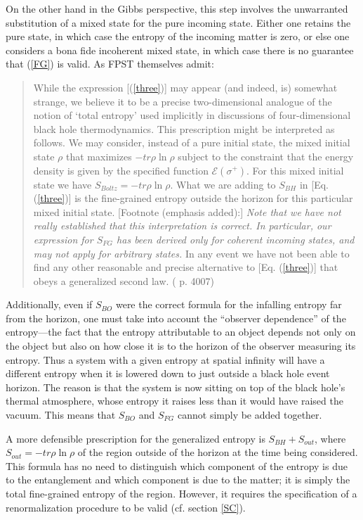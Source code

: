 \documentclass{article}
\begin{document}
On the other hand in the Gibbs perspective, this step involves the unwarranted substitution of a mixed state for the pure incoming state.  Either one retains the pure state, in which case the entropy of the incoming matter is zero, or else one considers a bona fide incoherent mixed state, in which case there is no guarantee that (\ref{FG}) is valid.  As FPST themselves admit:
\begin{quote}\small
While the expression [(\ref{three})] may appear (and indeed, is) somewhat strange, we believe it to be a precise two-dimensional analogue of the notion of `total entropy' used implicitly in discussions of four-dimensional black hole thermodynamics.  This prescription might be interpreted as follows.  We may consider, instead of a pure initial state, the mixed initial state $\rho$ that maximizes $-tr \rho\ln \rho$ subject to the constraint that the energy density is given by the specified function $\mathcal{E}(\sigma^{+})$.  For this mixed initial state we have $S_{Boltz} = -tr \rho\ln \rho$.  What we are adding to $S_{BH}$ in [Eq. (\ref{three})] is the fine-grained entropy outside the horizon for this particular mixed initial state.  [Footnote (emphasis added):] \emph{Note that we have not really established that this interpretation is correct.  In particular, our expression for $S_{FG}$ has been derived only for coherent incoming states, and may not apply for arbitrary states.}  In any event we have not been able to find any other reasonable and precise alternative to [Eq. (\ref{three})] that obeys a generalized second law.  (\cite{fiola94} p. 4007)
\end{quote}
Additionally, even if $S_{BO}$ were the correct formula for the infalling entropy far from the horizon, one must take into account the ``observer dependence'' \cite{MMR04} of the entropy---the fact that the entropy attributable to an object depends not only on the object but also on how close it is to the horizon of the observer measuring its entropy.  Thus a system with a given entropy at spatial infinity will have a different entropy when it is lowered down to just outside a black hole event horizon.  The reason is that the system is now sitting on top of the black hole's thermal atmosphere, whose entropy it raises less than it would have raised the vacuum.  This means that $S_{BO}$ and $S_{FG}$ cannot simply be added together.

A more defensible prescription for the generalized entropy is $S_{BH} + S_{out}$, where $S_{out} = -tr \rho\ln \rho$ of the region outside of the horizon at the time being considered.  This formula has no need to distinguish which component of the entropy is due to the entanglement and which component is due to the matter; it is simply the total fine-grained entropy of the region.  However, it requires the specification of a renormalization procedure to be valid (cf. section \ref{SC}).
\end{document}
